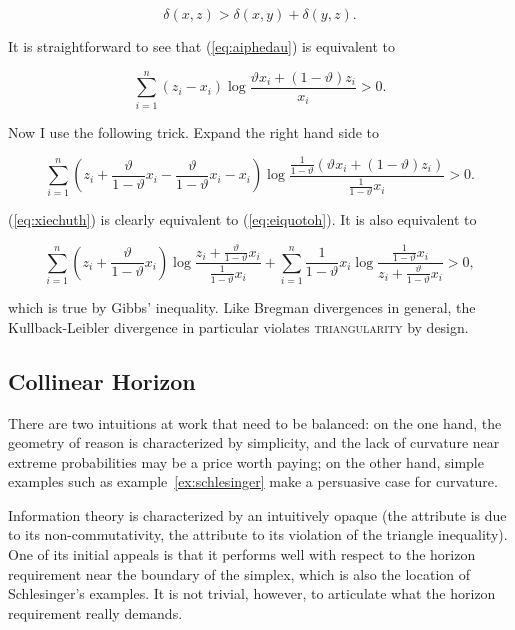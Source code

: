 \documentclass[smallextended]{svjour3}       %
\begin{document}
\begin{equation}
  \label{eq:aiphedau}
  \delta(x,z)>\delta\left(x,y\right)+\delta\left(y,z\right).
\end{equation}

It is straightforward to see that (\ref{eq:aiphedau}) is equivalent to

\begin{equation}
  \label{eq:eiquotoh}
  \sum_{i=1}^{n}(z_{i}-x_{i})\log\frac{\vartheta{}x_{i}+(1-\vartheta)z_{i}}{x_{i}}>0.
\end{equation}

Now I use the following trick. Expand the right hand side to

\begin{equation}
  \label{eq:xiechuth}
  \sum_{i=1}^{n}\left(z_{i}+\frac{\vartheta}{1-\vartheta}x_{i}-\frac{\vartheta}{1-\vartheta}x_{i}-x_{i}\right)\log\frac{\frac{1}{1-\vartheta}\left(\vartheta{}x_{i}+(1-\vartheta)z_{i}\right)}{\frac{1}{1-\vartheta}x_{i}}>0.
\end{equation}

(\ref{eq:xiechuth}) is clearly equivalent to (\ref{eq:eiquotoh}). It
is also equivalent to

\begin{equation}
  \label{eq:ohrohshi}
  \sum_{i=1}^{n}\left(z_{i}+\frac{\vartheta}{1-\vartheta}x_{i}\right)\log\frac{z_{i}+\frac{\vartheta}{1-\vartheta}x_{i}}{\frac{1}{1-\vartheta}x_{i}}+
  \sum_{i=1}^{n}\frac{1}{1-\vartheta}x_{i}\log\frac{\frac{1}{1-\vartheta}x_{i}}{z_{i}+\frac{\vartheta}{1-\vartheta}x_{i}}>0,
\end{equation}

which is true by Gibbs' inequality. Like Bregman divergences in
general, the Kullback-Leibler divergence in particular violates
\textsc{triangularity} by design.

\subsection{Collinear Horizon}
\label{subsec:colhor}

There are two intuitions at work that need to be balanced: on the one
hand, the geometry of reason is characterized by simplicity, and the
lack of curvature near extreme probabilities may be a price worth
paying; on the other hand, simple examples such as
example~\ref{ex:schlesinger} make a persuasive case for curvature.

Information theory is characterized by an intuitively opaque
 (the attribute  is due to its
non-commutativity, the attribute  to its violation of the
triangle inequality). One of its initial appeals is that it performs
well with respect to the horizon requirement near the boundary of the
simplex, which is also the location of Schlesinger's examples. It is
not trivial, however, to articulate what the horizon requirement
really demands.
\end{document}
